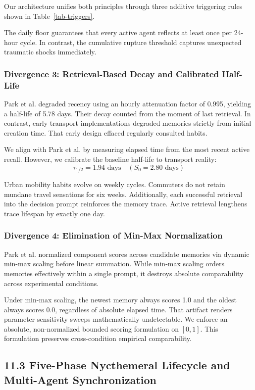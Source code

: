Our architecture unifies both principles through three additive triggering rules shown in Table~\ref{tab-triggers}.

The daily floor guarantees that every active agent reflects at least once per 24-hour cycle. In contrast, the cumulative rupture threshold captures unexpected traumatic shocks immediately.

\subsubsection{Divergence 3: Retrieval-Based Decay and Calibrated Half-Life}
Park et al. degraded recency using an hourly attenuation factor of 0.995, yielding a half-life of 5.78 days. Their decay counted from the moment of last retrieval. In contrast, early transport implementations degraded memories strictly from initial creation time. That early design effaced regularly consulted habits.

We align with Park et al. by measuring elapsed time from the most recent active recall. However, we calibrate the baseline half-life to transport reality:
\[\tau_{1/2} = 1.94 \text{ days} \quad (S_0 = 2.80 \text{ days})\]

Urban mobility habits evolve on weekly cycles. Commuters do not retain mundane travel sensations for six weeks. Additionally, each successful retrieval into the decision prompt reinforces the memory trace. Active retrieval lengthens trace lifespan by exactly one day.

\subsubsection{Divergence 4: Elimination of Min-Max Normalization}
Park et al. normalized component scores across candidate memories via dynamic min-max scaling before linear summation. While min-max scaling orders memories effectively within a single prompt, it destroys absolute comparability across experimental conditions.

Under min-max scaling, the newest memory always scores 1.0 and the oldest always scores 0.0, regardless of absolute elapsed time. That artifact renders parameter sensitivity sweeps mathematically undetectable. We enforce an absolute, non-normalized bounded scoring formulation on $[0, 1]$. This formulation preserves cross-condition empirical comparability.

\subsection{11.3 Five-Phase Nycthemeral Lifecycle and Multi-Agent Synchronization}

